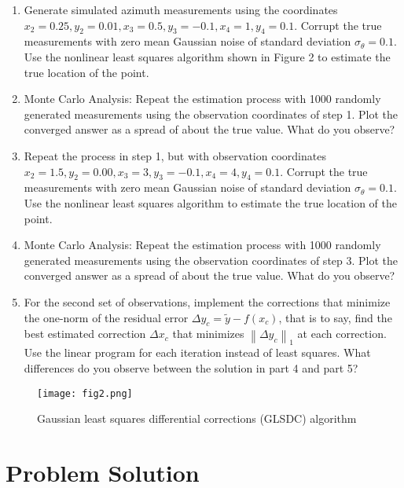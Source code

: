 \documentclass{article}
\begin{document}
\begin{enumerate}
    \item Generate simulated azimuth measurements using the coordinates $x_2 = 0.25, y_2 = 0.01, x_3 = 0.5, y_3 = -0.1, x_4 = 1, y_4 = 0.1$. Corrupt the true measurements with zero mean Gaussian noise of standard deviation $\sigma_\theta = 0.1$\degree. Use the nonlinear least squares algorithm shown in Figure 2 to estimate the true location of the point.
    \item Monte Carlo Analysis: Repeat the estimation process with 1000 randomly generated measurements using the observation coordinates of step 1. Plot the converged answer as a spread of about the true value. What do you observe?
    \item Repeat the process in step 1, but with observation coordinates $x_2 = 1.5, y_2 = 0.00, x_3 = 3, y_3 = -0.1, x_4 = 4, y_4 = 0.1$. Corrupt the true measurements with zero mean Gaussian noise of standard deviation $\sigma_\theta = 0.1$\degree. Use the nonlinear least squares algorithm to estimate the true location of the point.
    \item Monte Carlo Analysis: Repeat the estimation process with 1000 randomly generated measurements using the observation coordinates of step 3. Plot the converged answer as a spread of about the true value. What do you observe?
    \item For the second set of observations, implement the corrections that minimize the one-norm of the residual error $\Delta y_c = \tilde{y} - f(x_c)$, that is to say, find the best estimated correction $\Delta x_c$ that minimizes $\left\|\Delta y_c\right\|_1$ at each correction. Use the linear program for each iteration instead of least squares. What differences do you observe between the solution in part 4 and part 5?
\end{enumerate}

\begin{figure}[h]
    \centering
    \texttt{[image: fig2.png]}
    \caption{Gaussian least squares differential corrections (GLSDC) algorithm}
    \label{fig:enter-label}
\end{figure}

\section{Problem Solution}
\end{document}
